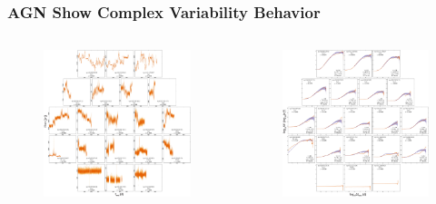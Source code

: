 \documentclass[hyperref={pdfpagelabels=false}]{beamer}
\begin{document}
\begin{frame}
\frametitle{AGN Show Complex Variability Behavior}
  \begin{columns}
    \centering
    \begin{column}{0.35\textwidth}
      \begin{figure}
        \includegraphics[scale=0.32]{images/AllLC.jpg}
      \end{figure}
    \end{column}
    \begin{column}{0.35\textwidth}
        \begin{figure}
          \includegraphics[scale=0.32]{images/AllSF.jpg}

\end{figure}
\end{column}
\end{columns}
\end{frame}
\end{document}
